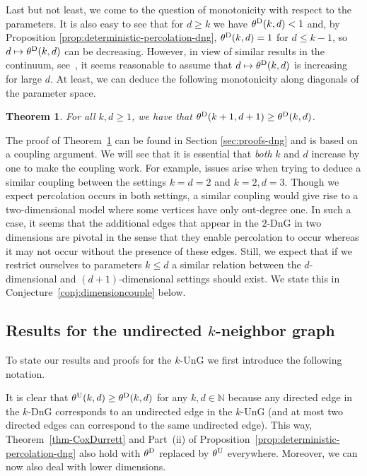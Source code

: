 \documentclass[a4paper, oneside, 11pt]{amsart}
\newcommand{\N}{\mathbb{N}}
\newtheorem{theorem}{Theorem}[section]
\theoremstyle{definition}
\newcommand{\1}{\mathbbm{1}}
\newcommand{\0}{\mathbf{o}}
\numberwithin{equation}{section}
\begin{document}
Last but not least, we come to the question of monotonicity with respect to the parameters. It is also easy to see that for $d \geq k$ we have $\theta^{\rm D}(k,d) <1$ and, by Proposition \ref{prop:deterministic-percolation-dng}, $\theta^{\rm D}(k,d)=1$ for $d\le k-1$, so $d\mapsto \theta^{\rm D}(k,d)$ can be decreasing. However, in view of similar results in the continuum, see~\cite{HaggMee96}, it seems reasonable to assume that $d\mapsto \theta^{\rm D}(k,d)$ is increasing for large $d$. At least, we can deduce the following monotonicity along diagonals of the parameter space. 

\begin{theorem}\label{theorem-3322}
For all $k,d\ge1$, we have that $\theta^{\rm D}(k+1,d+1)\ge \theta^{\rm D}(k,d)$.
\end{theorem}

The proof of Theorem~\ref{theorem-3322} can be found in Section \ref{sec:proofs-dng} and is based on a coupling argument. We will see that it is essential that \emph{both} $k$ and $d$ increase by one to make the coupling work. For example, issues arise when trying to deduce a similar coupling between the settings $k=d=2$ and $k=2,d=3$. Though we expect percolation occurs in both settings, a similar coupling would give rise to a two-dimensional model where some vertices have only out-degree one. In such a case, it seems that the additional edges that appear in the $2$-DnG in two dimensions are pivotal in the sense that they enable percolation to occur whereas it may not occur without the presence of these edges. 
Still, we expect that if we restrict ourselves to parameters $k \leq d$ a similar relation between the $d$-dimensional and $(d+1)$-dimensional settings should exist. We state this in Conjecture~\ref{conj:dimensioncouple} below.

\subsection{Results for the undirected $k$-neighbor graph}

To state our results and proofs for the $k$-UnG we first introduce the following notation. 

It is clear that $\theta^{\rm U}(k,d) \geq \theta^{\rm D}(k,d)$ for any $k,d\in \N$ because any directed edge in the $k$-DnG corresponds to an undirected edge in the $k$-UnG (and at most two directed edges can correspond to the same undirected edge). This way, Theorem~\ref{thm-CoxDurrett} and Part~(ii) of Proposition~\ref{prop:deterministic-percolation-dng} also hold with $\theta^{\rm D}$ replaced by $\theta^{\rm U}$ everywhere. Moreover, we can now also deal with lower dimensions. 
\end{document}
